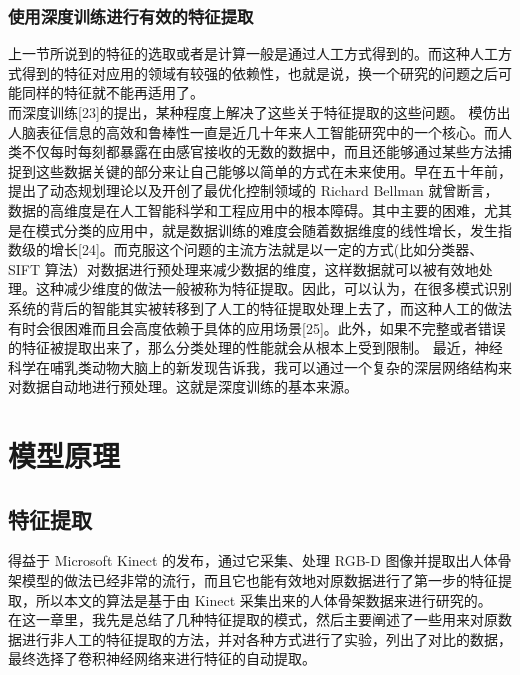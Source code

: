 \subsubsection{使用深度训练进行有效的特征提取}\label{ux4f7fux7528ux6df1ux5ea6ux8badux7ec3ux8fdbux884cux6709ux6548ux7684ux7279ux5f81ux63d0ux53d6}

上一节所说到的特征的选取或者是计算一般是通过人工方式得到的。而这种人工方式得到的特征对应用的领域有较强的依赖性，也就是说，换一个研究的问题之后可能同样的特征就不能再适用了。\\而深度训练{[}23{]}的提出，某种程度上解决了这些关于特征提取的这些问题。
模仿出人脑表征信息的高效和鲁棒性一直是近几十年来人工智能研究中的一个核心。而人类不仅每时每刻都暴露在由感官接收的无数的数据中，而且还能够通过某些方法捕捉到这些数据关键的部分来让自己能够以简单的方式在未来使用。早在五十年前，提出了动态规划理论以及开创了最优化控制领域的
Richard Bellman
就曾断言，数据的高维度是在人工智能科学和工程应用中的根本障碍。其中主要的困难，尤其是在模式分类的应用中，就是数据训练的难度会随着数据维度的线性增长，发生指数级的增长{[}24{]}。而克服这个问题的主流方法就是以一定的方式(比如分类器、SIFT
算法）对数据进行预处理来减少数据的维度，这样数据就可以被有效地处理。这种减少维度的做法一般被称为特征提取。因此，可以认为，在很多模式识别系统的背后的智能其实被转移到了人工的特征提取处理上去了，而这种人工的做法有时会很困难而且会高度依赖于具体的应用场景{[}25{]}。此外，如果不完整或者错误的特征被提取出来了，那么分类处理的性能就会从根本上受到限制。
最近，神经科学在哺乳类动物大脑上的新发现告诉我，我可以通过一个复杂的深层网络结构来对数据自动地进行预处理。这就是深度训练的基本来源。

\section{模型原理}\label{ux6a21ux578bux539fux7406}

\subsection{特征提取}\label{ux7279ux5f81ux63d0ux53d6}

得益于 Microsoft Kinect 的发布，通过它采集、处理 RGB-D
图像并提取出人体骨架模型的做法已经非常的流行，而且它也能有效地对原数据进行了第一步的特征提取，所以本文的算法是基于由
Kinect
采集出来的人体骨架数据来进行研究的。\\在这一章里，我先是总结了几种特征提取的模式，然后主要阐述了一些用来对原数据进行非人工的特征提取的方法，并对各种方式进行了实验，列出了对比的数据，最终选择了卷积神经网络来进行特征的自动提取。

